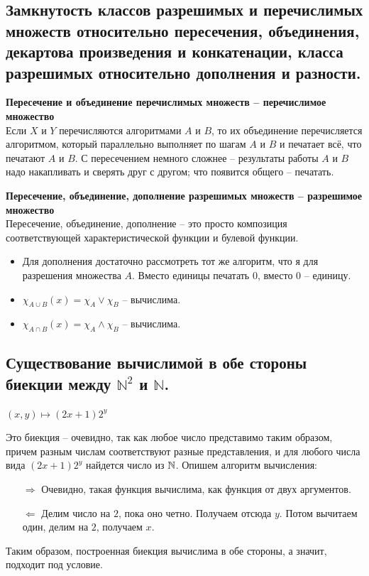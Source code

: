 \subsection{Замкнутость классов разрешимых и перечислимых множеств относительно пересечения, объединения, декартова произведения и конкатенации, класса разрешимых относительно дополнения и разности.}
\textbf{Пересечение и объединение перечислимых множеств -- перечислимое множество}
\\
Если $X$ и $Y$ перечисляются алгоритмами $A$ и $B$, то их объединение перечисляется алгоритмом, который параллельно выполняет по шагам $A$ и $B$ и печатает всё, что печатают $A$ и $B$. С пересечением немного сложнее -- результаты работы $A$ и $B$ надо накапливать и сверять друг с другом; что появится общего -- печатать.

\textbf{Пересечение, объединение, дополнение разрешимых множеств -- разрешимое множество}\\
Пересечение, объединение, дополнение -- это просто композиция соответствующей характеристической функции и булевой функции.
\begin{itemize}
    \item Для дополнения достаточно рассмотреть тот же алгоритм, что я для разрешения множества $A$. Вместо единицы печатать $0$, вместо $0$ -- единицу.
    \item $\chi_{A \cup B}(x) = \chi_A \vee \chi_B$ -- вычислима.
    \item $\chi_{A \cap B}(x) = \chi_A \wedge \chi_B$ -- вычислима.
\end{itemize}

\subsection{Существование вычислимой в обе стороны биекции между $\mathbb{N}^2$ и $\mathbb{N}$.}
$(x,y) \mapsto (2x + 1)2^y$

Это биекция -- очевидно, так как любое число представимо таким образом, причем разным числам соответствуют разные представления, и для любого числа вида $(2x + 1)2^y$ найдется число из $\mathbb{N}$. Опишем алгоритм вычисления:
\begin{itemize}
    \item[$\Rightarrow$] Очевидно, такая функция вычислима, как функция от двух аргументов.
    \item[$\Leftarrow$] Делим число на $2$, пока оно четно. Получаем отсюда $y$. Потом вычитаем один, делим на $2$, получаем $x$. 
\end{itemize}
Таким образом, построенная биекция вычислима в обе стороны, а значит, подходит под условие.

